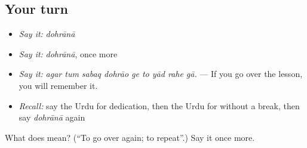 \subsection*{Your turn}
\begin{itemize}
\raggedright
  \item \emph{Say it:} \emph{dohrānā}
  \item \emph{Say it:} \emph{dohrānā}, once more
  \item \emph{Say it:} \emph{agar tum sabaq dohrāo ge to yād rahe gā.} — If you go over the lesson, you will remember it.
  \item \emph{Recall:} say the Urdu for dedication, then the Urdu for without a break, then say \emph{dohrānā} again
\end{itemize}

\begin{tcolorbox}[breakable,colback=teal!4,colframe=teal!35!black,title={Before you move on}]
What does  mean? (\textquotedblleft{}To go over again; to repeat\textquotedblright{}.) Say it once more.
\end{tcolorbox}
